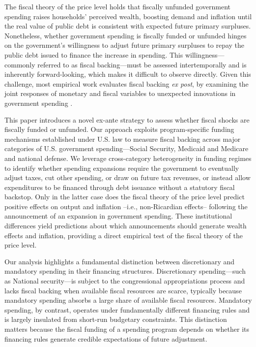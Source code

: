 \documentclass[12pt]{article}%
\theoremstyle{remark}
\begin{document}
The fiscal theory of the price level holds that fiscally unfunded government spending raises households' perceived wealth, boosting demand and inflation until the real value of public debt is consistent with expected future primary surpluses.
Nonetheless, whether government spending is fiscally funded or unfunded hinges on the government’s willingness to adjust future primary surpluses to repay the public debt issued to finance the increase in spending.
This willingness---commonly referred to as fiscal backing---must be assessed intertemporally and is inherently forward-looking, which makes it difficult to observe directly. Given this challenge, most empirical work evaluates fiscal backing \textit{ex post}, by examining the joint responses of monetary and fiscal variables to unexpected innovations in government spending \citep[see, e.g.,][]{Bianchiillut, BM2017, LeeperTraumWalker:2017,EusepiPreston2018,Cochranebook,BFM2023,JacobsonLeeperPreston2024,Barro_Bianchi25}.

This paper introduces a novel ex-ante strategy to assess whether fiscal shocks are fiscally funded or unfunded. Our approach exploits program-specific funding mechanisms established under U.S. law to measure fiscal backing across major categories of U.S. government spending---Social Security, Medicaid and Medicare and national defense. We leverage cross-category heterogeneity in funding regimes to identify whether spending expansions require the government to eventually adjust taxes, cut other spending, or draw on future tax revenues, or instead allow expenditures to be financed through debt issuance without a statutory fiscal backstop. Only in the latter case does the fiscal theory of the price level predict positive effects on output and inflation --i.e., non-Ricardian effects-- following the announcement of an expansion in government spending.  These institutional differences yield predictions about which announcements should generate wealth effects and inflation, providing a direct empirical test of the fiscal theory of the price level.

Our analysis highlights a fundamental distinction between discretionary and mandatory spending in their financing structures. Discretionary spending---such as National security---is subject to the congressional appropriations process and lacks fiscal backing when available fiscal resources are scarce, typically because mandatory spending absorbs a large share of available fiscal resources. Mandatory spending, by contrast, operates under fundamentally different financing rules and is largely insulated from short-run budgetary constraints.
This distinction matters because the fiscal funding of a spending program depends on whether its financing rules generate credible expectations of future adjustment.
\end{document}

